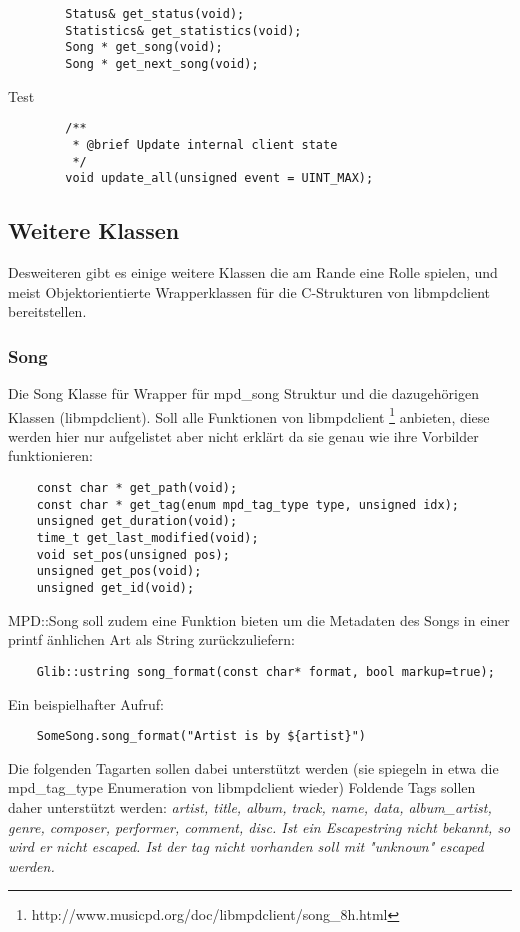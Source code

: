 \begin{verbatim}
        Status& get_status(void);
        Statistics& get_statistics(void);
        Song * get_song(void);
        Song * get_next_song(void);
\end{verbatim}

Test
\begin{verbatim}
        /**
         * @brief Update internal client state
         */
        void update_all(unsigned event = UINT_MAX);
\end{verbatim}


\subsection{Weitere Klassen}
Desweiteren gibt es einige weitere Klassen die am Rande eine Rolle spielen,
und meist Objektorientierte Wrapperklassen für die C-Strukturen von libmpdclient bereitstellen.

\subsubsection{Song}

Die Song Klasse für Wrapper für mpd\_song Struktur und die dazugehörigen Klassen (libmpdclient).
Soll alle Funktionen von libmpdclient \footnote{http://www.musicpd.org/doc/libmpdclient/song\_8h.html} anbieten,
diese werden hier nur aufgelistet aber nicht erklärt da sie genau wie ihre Vorbilder funktionieren:

\begin{verbatim}
    const char * get_path(void);
    const char * get_tag(enum mpd_tag_type type, unsigned idx);
    unsigned get_duration(void);
    time_t get_last_modified(void);
    void set_pos(unsigned pos);
    unsigned get_pos(void);
    unsigned get_id(void);
\end{verbatim}

MPD::Song soll zudem eine Funktion bieten um die Metadaten des Songs in einer printf änhlichen Art als String zurückzuliefern:
\begin{verbatim}
    Glib::ustring song_format(const char* format, bool markup=true);
\end{verbatim}

Ein beispielhafter Aufruf:
\begin{verbatim}
    SomeSong.song_format("Artist is by ${artist}") 
\end{verbatim}

Die folgenden Tagarten sollen dabei unterstützt werden (sie spiegeln in etwa die mpd\_tag\_type Enumeration von libmpdclient wieder)
Foldende Tags sollen daher unterstützt werden: \it artist, title, album, track, name, data, album\_artist, genre, composer, performer, comment, disc\rm.
Ist ein Escapestring nicht bekannt, so wird er nicht escaped. Ist der tag nicht vorhanden soll mit "unknown" escaped werden.


